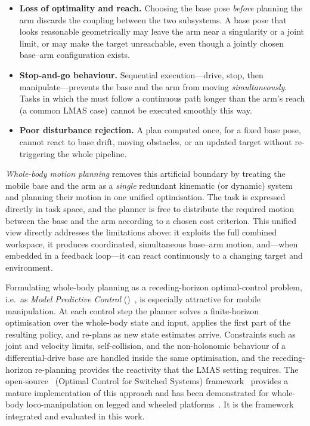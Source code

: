 \begin{itemize}
  \item \textbf{Loss of optimality and reach.} Choosing the base pose
        \emph{before} planning the arm discards the coupling between the
        two subsystems. A base pose that looks reasonable geometrically
        may leave the arm near a singularity or a joint limit, or may
        make the \ee{} target unreachable, even though a jointly chosen
        base--arm configuration exists.
  \item \textbf{Stop-and-go behaviour.} Sequential execution---drive,
        stop, then manipulate---prevents the base and the arm from moving
        \emph{simultaneously}. Tasks in which the \ee{} must follow a
        continuous path longer than the arm's reach (a common LMAS case)
        cannot be executed smoothly this way.
  \item \textbf{Poor disturbance rejection.} A plan computed once, for a
        fixed base pose, cannot react to base drift, moving obstacles, or
        an updated target without re-triggering the whole pipeline.
\end{itemize}

\emph{Whole-body motion planning} removes this artificial boundary by
treating the mobile base and the arm as a \emph{single} redundant
kinematic (or dynamic) system and planning their motion in one unified
optimisation. The \ee{} task is expressed directly in task space, and the
planner is free to distribute the required motion between the base and the
arm according to a chosen cost criterion. This unified view directly
addresses the limitations above: it exploits the full combined workspace,
it produces coordinated, simultaneous base--arm motion, and---when
embedded in a feedback loop---it can react continuously to a changing
target and environment.

Formulating whole-body planning as a receding-horizon optimal-control
problem, i.e.\ as \emph{Model Predictive Control}
(\mpc{})~\cite{Rawlings2017MPC}, is especially attractive for mobile
manipulation. At each control step the planner solves a finite-horizon
optimisation over the whole-body state and input, applies the first part
of the resulting policy, and re-plans as new state estimates arrive.
Constraints such as joint and velocity limits, self-collision, and the
non-holonomic behaviour of a differential-drive base are handled inside
the same optimisation, and the receding-horizon re-planning provides the
reactivity that the LMAS setting requires. The open-source
\ocs{}~(Optimal Control for Switched Systems)
framework~\cite{ocs2Toolbox} provides a mature implementation of this
approach and has been demonstrated for whole-body loco-manipulation on
legged and wheeled platforms~\cite{Sleiman2021UnifiedMPC}. It is the
framework integrated and evaluated in this work.

